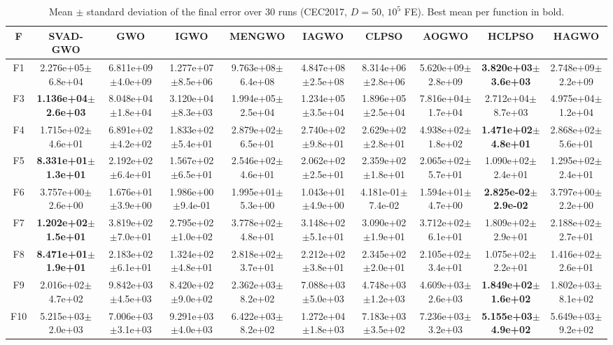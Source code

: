 \begin{table}[t]
\centering
\caption{Mean $\pm$ standard deviation of the final error over 30 runs (CEC2017, $D=50$, $10^5$ FE). Best mean per function in bold.}
\label{tab:meanstd}
\begin{tabular}{cccccccccc}
\hline
F & SVAD-GWO & GWO & IGWO & MENGWO & IAGWO & CLPSO & AOGWO & HCLPSO & HAGWO \\
\hline
F1 & 2.276e+05$\pm$6.8e+04 & 6.811e+09$\pm$4.0e+09 & 1.277e+07$\pm$8.5e+06 & 9.763e+08$\pm$6.4e+08 & 4.847e+08$\pm$2.5e+08 & 8.314e+06$\pm$2.8e+06 & 5.620e+09$\pm$2.8e+09 & \textbf{3.820e+03$\pm$3.6e+03} & 2.748e+09$\pm$2.2e+09 \\
F3 & \textbf{1.136e+04$\pm$2.6e+03} & 8.048e+04$\pm$1.8e+04 & 3.120e+04$\pm$8.3e+03 & 1.994e+05$\pm$2.5e+04 & 1.234e+05$\pm$3.5e+04 & 1.896e+05$\pm$2.5e+04 & 7.816e+04$\pm$1.7e+04 & 2.712e+04$\pm$8.7e+03 & 4.975e+04$\pm$1.2e+04 \\
F4 & 1.715e+02$\pm$4.6e+01 & 6.891e+02$\pm$4.2e+02 & 1.833e+02$\pm$5.4e+01 & 2.879e+02$\pm$6.5e+01 & 2.740e+02$\pm$9.8e+01 & 2.629e+02$\pm$2.8e+01 & 4.938e+02$\pm$1.8e+02 & \textbf{1.471e+02$\pm$4.8e+01} & 2.868e+02$\pm$5.6e+01 \\
F5 & \textbf{8.331e+01$\pm$1.3e+01} & 2.192e+02$\pm$6.4e+01 & 1.567e+02$\pm$6.5e+01 & 2.546e+02$\pm$4.6e+01 & 2.062e+02$\pm$2.5e+01 & 2.359e+02$\pm$1.8e+01 & 2.065e+02$\pm$5.7e+01 & 1.090e+02$\pm$2.4e+01 & 1.295e+02$\pm$2.4e+01 \\
F6 & 3.757e+00$\pm$2.6e+00 & 1.676e+01$\pm$3.9e+00 & 1.986e+00$\pm$9.4e-01 & 1.995e+01$\pm$5.3e+00 & 1.043e+01$\pm$4.9e+00 & 4.181e-01$\pm$7.4e-02 & 1.594e+01$\pm$4.7e+00 & \textbf{2.825e-02$\pm$2.9e-02} & 3.797e+00$\pm$2.2e+00 \\
F7 & \textbf{1.202e+02$\pm$1.5e+01} & 3.819e+02$\pm$7.0e+01 & 2.795e+02$\pm$1.0e+02 & 3.778e+02$\pm$4.8e+01 & 3.148e+02$\pm$5.1e+01 & 3.090e+02$\pm$1.9e+01 & 3.712e+02$\pm$6.1e+01 & 1.809e+02$\pm$2.9e+01 & 2.188e+02$\pm$2.7e+01 \\
F8 & \textbf{8.471e+01$\pm$1.9e+01} & 2.183e+02$\pm$6.1e+01 & 1.324e+02$\pm$4.8e+01 & 2.818e+02$\pm$3.7e+01 & 2.212e+02$\pm$3.8e+01 & 2.345e+02$\pm$2.0e+01 & 2.105e+02$\pm$3.4e+01 & 1.075e+02$\pm$2.2e+01 & 1.416e+02$\pm$2.6e+01 \\
F9 & 2.016e+02$\pm$4.7e+02 & 9.842e+03$\pm$4.5e+03 & 8.420e+02$\pm$9.0e+02 & 2.362e+03$\pm$8.2e+02 & 7.088e+03$\pm$5.0e+03 & 4.748e+03$\pm$1.2e+03 & 4.609e+03$\pm$2.6e+03 & \textbf{1.849e+02$\pm$1.6e+02} & 1.802e+03$\pm$8.1e+02 \\
F10 & 5.215e+03$\pm$2.0e+03 & 7.006e+03$\pm$3.1e+03 & 9.291e+03$\pm$4.0e+03 & 6.422e+03$\pm$8.2e+02 & 1.272e+04$\pm$1.8e+03 & 7.183e+03$\pm$3.5e+02 & 7.236e+03$\pm$3.2e+03 & \textbf{5.155e+03$\pm$4.9e+02} & 5.649e+03$\pm$9.2e+02 \\

\end{tabular}
\end{table}
